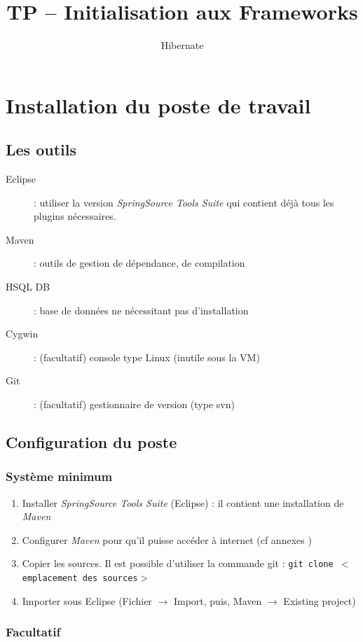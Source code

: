 \documentclass[small,algo]{dushClass}
\title{TP -- Initialisation aux Frameworks}
\subtitle{Hibernate}
\begin{document}
\section{Installation du poste de travail}

\subsection{Les outils}
\begin{description}
\item[Eclipse] : utiliser la version \emph{SpringSource Tools Suite} qui contient déjà tous les plugins nécessaires.
\item[Maven] : outils de gestion de dépendance, de compilation
\item[HSQL DB] : base de données ne nécessitant pas d'installation
\item[Cygwin] : (facultatif) console type Linux (inutile sous la VM)
\item[Git] : (facultatif) gestionnaire de version (type svn)
\end{description}

\subsection{Configuration du poste}

\subsubsection{Système minimum}

\begin{enumerate}
\item Installer \emph{SpringSource Tools Suite} (Eclipse) : il contient une installation de \emph{Maven}
\item Configurer \emph{Maven} pour qu'il puisse accéder à internet (cf annexes )
\item Copier les sources. Il est possible d'utiliser la commande git : \texttt{git clone $<$emplacement des sources$>$ }
\item Importer sous Eclipse (Fichier $\rightarrow$ Import, puis, Maven $\rightarrow$ Existing project)
\end{enumerate}

\subsubsection{Facultatif}
\end{document}
